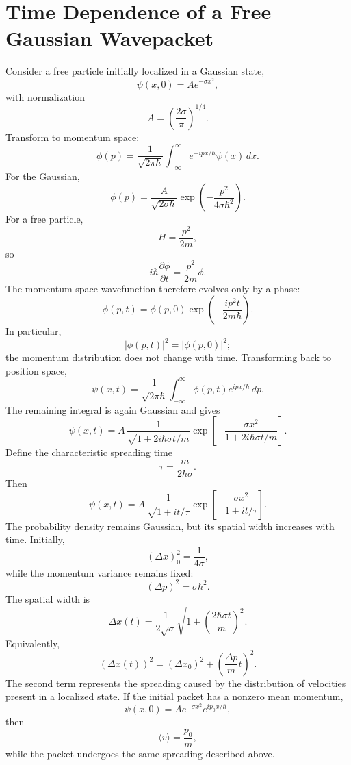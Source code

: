 \documentclass[11pt]{article}
\begin{document}
\section{Time Dependence of a Free Gaussian Wavepacket}
Consider a free particle initially localized in a Gaussian state,
\[
\psi(x,0)
=
A e^{-\sigma x^2},
\]
with normalization
\[
A=
\left(\frac{2\sigma}{\pi}\right)^{1/4}.
\]
Transform to momentum space:
\[
\phi(p)
=
\frac{1}{\sqrt{2\pi\hbar}}
\int_{-\infty}^{\infty}
e^{-ipx/\hbar}\psi(x)\,dx.
\]
For the Gaussian,
\[
\phi(p)
=
\frac{A}{\sqrt{2\sigma\hbar}}
\exp\left(
-\frac{p^2}{4\sigma\hbar^2}
\right).
\]
For a free particle,
\[
H=\frac{p^2}{2m},
\]
so
\[
i\hbar\frac{\partial\phi}{\partial t}
=
\frac{p^2}{2m}\phi.
\]
The momentum-space wavefunction therefore evolves only by a phase:
\[
\boxed{
\phi(p,t)
=
\phi(p,0)
\exp\left(
-\frac{ip^2t}{2m\hbar}
\right).
}
\]
In particular,
\[
|\phi(p,t)|^2=|\phi(p,0)|^2;
\]
the momentum distribution does not change with time.
Transforming back to position space,
\[
\psi(x,t)
=
\frac{1}{\sqrt{2\pi\hbar}}
\int_{-\infty}^{\infty}
\phi(p,t)e^{ipx/\hbar}\,dp.
\]
The remaining integral is again Gaussian and gives
\[
\boxed{
\psi(x,t)
=
A\,
\frac{1}{\sqrt{1+2i\hbar\sigma t/m}}
\exp\left[
-\frac{\sigma x^2}
{1+2i\hbar\sigma t/m}
\right].
}
\]
Define the characteristic spreading time
\[
\boxed{
\tau=\frac{m}{2\hbar\sigma}.
}
\]
Then
\[
\psi(x,t)
=
A\,
\frac{1}{\sqrt{1+it/\tau}}
\exp\left[
-\frac{\sigma x^2}{1+it/\tau}
\right].
\]
The probability density remains Gaussian, but its spatial width increases
with time. Initially,
\[
(\Delta x)_0^2=\frac{1}{4\sigma},
\]
while the momentum variance remains fixed:
\[
(\Delta p)^2=\sigma\hbar^2.
\]
The spatial width is
\[
\boxed{
\Delta x(t)
=
\frac{1}{2\sqrt{\sigma}}
\sqrt{
1+
\left(
\frac{2\hbar\sigma t}{m}
\right)^2
}.
}
\]
Equivalently,
\[
\boxed{
(\Delta x(t))^2
=
(\Delta x_0)^2
+
\left(
\frac{\Delta p}{m}t
\right)^2.
}
\]
The second term represents the spreading caused by the distribution of
velocities present in a localized state.
If the initial packet has a nonzero mean momentum,
\[
\psi(x,0)
=
A e^{-\sigma x^2}e^{ip_0x/\hbar},
\]
then
\[
\langle v\rangle=\frac{p_0}{m},
\]
while the packet undergoes the same spreading described above.
\end{document}
